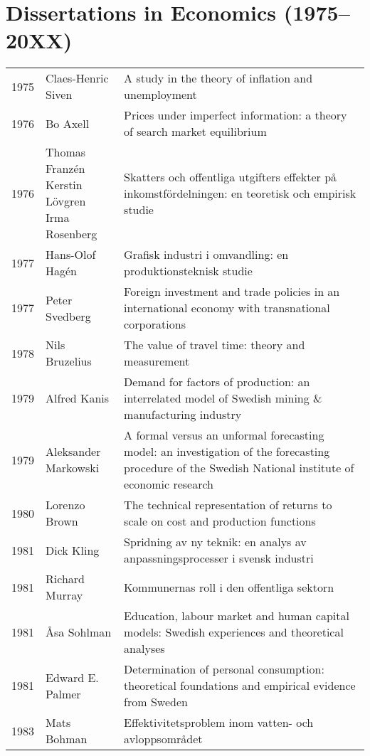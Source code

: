 \chapter*{Dissertations in Economics (1975--20XX)}
{\scriptsize%
\begin{longtable}{p{} p{} p{}}
    1975 & Claes-Henric Siven & A study in the theory of inflation and unemployment \\
    1976 & Bo Axell & Prices under imperfect information: a theory of search market equilibrium \\
    1976 & \makecell[tl]{Thomas Franzén \\Kerstin Lövgren \\Irma Rosenberg}& Skatters och offentliga utgifters effekter på inkomstfördelningen: en teoretisk och empirisk studie \\
    1977 & Hans-Olof Hagén & Grafisk industri i omvandling: en produktionsteknisk studie \\
    1977 & Peter Svedberg & Foreign investment and trade policies in an international economy with transnational corporations \\
    1978 & Nils Bruzelius & The value of travel time: theory and measurement \\
    1979 & Alfred Kanis & Demand for factors of production: an interrelated model of Swedish mining \& manufacturing industry \\
    1979 & Aleksander Markowski & A formal versus an unformal forecasting model: an investigation of the forecasting procedure of the Swedish National institute of economic research \\
    1980 & Lorenzo Brown & The technical representation of returns to scale on cost and production functions \\
    1981 & Dick Kling & Spridning av ny teknik: en analys av anpassningsprocesser i svensk industri \\
    1981 & Richard Murray & Kommunernas roll i den offentliga sektorn \\
    1981 & Åsa Sohlman & Education, labour market and human capital models: Swedish experiences and theoretical analyses \\
    1981 & Edward E. Palmer & Determination of personal consumption: theoretical foundations and empirical evidence from Sweden \\
    1983 & Mats Bohman & Effektivitetsproblem inom vatten- och avloppsområdet \\

\end{longtable}}
